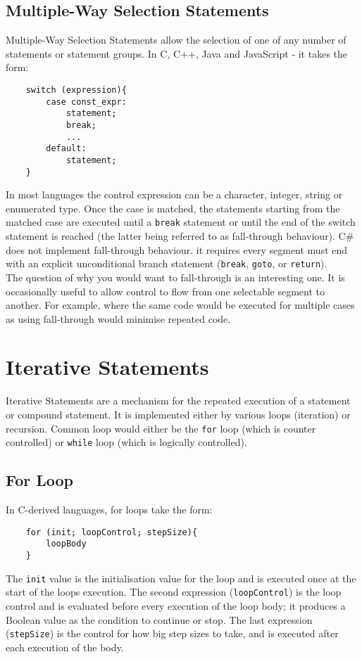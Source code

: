 \subsection{Multiple-Way Selection Statements}
Multiple-Way Selection Statements allow the selection of one of any number of statements or statement groups. In C, C++, Java and JavaScript - it takes the form:
\begin{verbatim}
    switch (expression){
        case const_expr:
            statement;
            break;
            ...
        default:
            statement;
    }
\end{verbatim}

In most languages the control expression can be a character, integer, string or enumerated type. Once the case is matched, the statements starting from the matched case are executed until a \verb|break| statement or until the end of the switch statement is reached (the latter being referred to as fall-through behaviour). C\# does not implement fall-through behaviour. it requires every segment must end with an explicit unconditional branch statement (\verb|break|, \verb|goto|, or \verb|return|).\\

The question of why you would want to fall-through is an interesting one. It is occasionally useful to allow control to flow from one selectable segment to another. For example, where the same code would be executed for multiple cases as using fall-through would minimise repeated code.

\section{Iterative Statements}
Iterative Statements are a mechanism for the repeated execution of a statement or compound statement. It is implemented either by various loops (iteration) or recursion. Common loop would either be the \verb|for| loop (which is counter controlled) or \verb|while| loop (which is logically controlled). 

\subsection{For Loop}
In C-derived languages, for loops take the form:
\begin{verbatim}
    for (init; loopControl; stepSize){
        loopBody
    }
\end{verbatim}

The \verb|init| value is the initialisation value for the loop and is executed once at the start of the loops execution. The second expression (\verb|loopControl|) is the loop control and is evaluated before every execution of the loop body; it produces a Boolean value as the condition to continue or stop. The last expression (\verb|stepSize|) is the control for how big step sizes to take, and is executed after each execution of the body.\\

